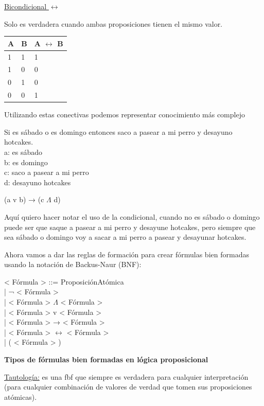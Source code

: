 \documentclass[11pt,fleqn]{book} %
\begin{document}
\underline{Bicondicional $\leftrightarrow$}

Solo es verdadera cuando ambas proposiciones tienen el mismo valor.

\begin{tabular}{|l|l|l|}
\hline
	A	& B	& A $\leftrightarrow$ B \\
\hline
	1 & 1 & 1\\
\hline
	1 & 0 & 0\\
\hline
	0 & 1 & 0\\
\hline
	0 & 0 & 1\\
\hline
\end{tabular}

Utilizando estas conectivas podemos representar conocimiento más complejo

Si es sábado o es domingo entonces saco a pasear a mi perro y desayuno hotcakes. \\
a: es sábado \\
b: es domingo \\
c: saco a pasear a mi perro \\
d: desayuno hotcakes

(a v b) → (c $\Lambda$ d)

Aquí quiero hacer notar el uso de la condicional, cuando no es sábado o domingo puede ser que saque a pasear a mi perro y desayune hotcakes, pero siempre que sea sábado o domingo voy a sacar a mi perro a pasear y desayunar hotcakes.

Ahora vamos a dar las reglas de formación para crear fórmulas bien formadas usando la notación de Backus-Naur (BNF):

< Fórmula > ::= ProposiciónAtómica\\
\phantom{.} \quad	\quad \quad \quad| ¬ < Fórmula >\\
\phantom{.} \quad	\quad \quad \quad| < Fórmula > $\Lambda$ < Fórmula >\\
\phantom{.} \quad	\quad \quad \quad| < Fórmula > v < Fórmula >\\
\phantom{.} \quad	\quad \quad \quad| < Fórmula > → < Fórmula >\\
\phantom{.} \quad	\quad \quad \quad| < Fórmula > $\leftrightarrow$ < Fórmula >\\
\phantom{.} \quad	\quad \quad \quad| ( < Fórmula > )

\textbf{Tipos de fórmulas bien formadas en lógica proposicional}

\underline{Tautología:} es una fbf que siempre es verdadera para cualquier interpretación (para cualquier combinación de valores de verdad que tomen sus proposiciones atómicas).
\end{document}
